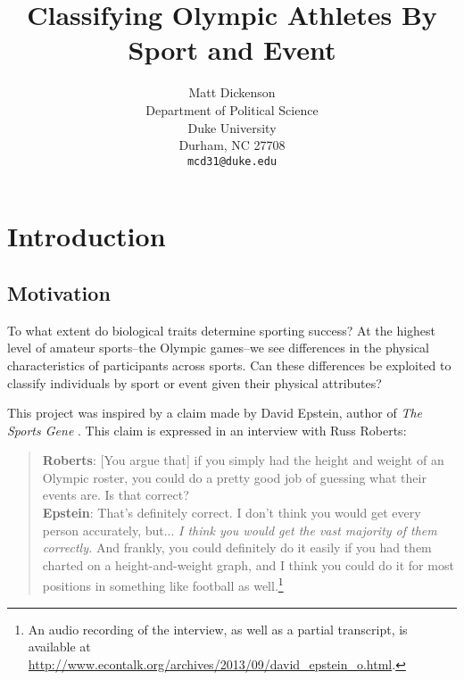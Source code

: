 \documentclass[12pt,letterpaper]{article} %
\title{Classifying Olympic Athletes By Sport and Event}
\author{
Matt Dickenson\\
Department of Political Science\\
Duke University\\
Durham, NC 27708 \\
\texttt{mcd31@duke.edu}
}
\begin{document}
\begin{titlepage}

\clearpage
\maketitle
\thispagestyle{empty}

\begin{abstract}
\end{abstract}

\end{titlepage}



\newpage

\section{Introduction}

\subsection{Motivation}

To what extent do biological traits determine sporting success? At the highest level of amateur sports--the Olympic games--we see differences in the physical characteristics of participants across sports. Can these differences be exploited to classify individuals by sport or event given their physical attributes? 

This project was inspired by a claim made by David Epstein, author of \textit{The Sports Gene} \citep{epstein2013sports}. This claim is expressed in an interview with Russ Roberts:

\begin{quote}
\footnotesize
\textbf{Roberts}: [You argue that] if you simply had the height and weight of an Olympic roster, you could do a pretty good job of guessing what their events are. Is that correct? \\
\textbf{Epstein}: That's definitely correct. I don't think you would get every person accurately, but... \textit{I think you would get the vast majority of them correctly.} And frankly, you could definitely do it easily if you had them charted on a height-and-weight graph, and I think you could do it for most positions in something like football as well.\footnote{An audio recording of the interview, as well as a partial transcript, is available at \url{http://www.econtalk.org/archives/2013/09/david_epstein_o.html}.}
\end{quote}
\end{document}
